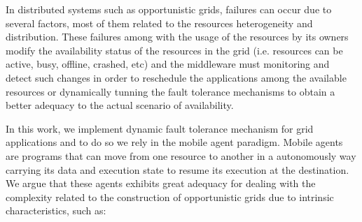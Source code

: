 \documentclass[times, 10pt, twocolumn]{article}
\begin{document}

In distributed systems such as opportunistic grids, failures can occur due to
several factors, most of them related to the resources heterogeneity and
distribution. These failures among with the usage of the resources by its
owners modify the availability status of the resources in the grid (i.e.
resources can be active, busy, offline, crashed, etc) and the middleware must
monitoring and detect such changes in order to reschedule the applications
among the available resources or dynamically tunning the fault tolerance
mechanisms to obtain a better adequacy to the actual scenario of availability. 

In this work, we implement dynamic fault tolerance mechanism for grid
applications and to do so we rely in the mobile agent paradigm. Mobile agents
are programs that can move from one resource to another in a autonomously way
carrying its data and execution state to resume its execution at the
destination. We argue that these agents exhibits great adequacy for dealing
with the complexity related to the construction of opportunistic grids due to
intrinsic characteristics, such as:
\end{document}
